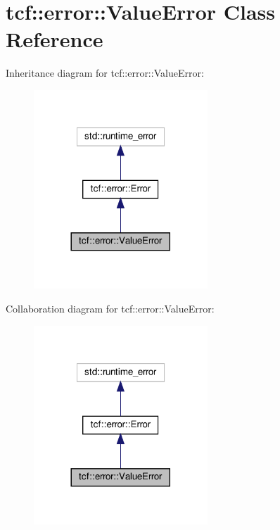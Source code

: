 \hypertarget{classtcf_1_1error_1_1ValueError}{}\section{tcf\+:\+:error\+:\+:Value\+Error Class Reference}
\label{classtcf_1_1error_1_1ValueError}


Inheritance diagram for tcf\+:\+:error\+:\+:Value\+Error\+:
\nopagebreak
\begin{figure}[H]
\begin{center}
\leavevmode
\includegraphics[width=185pt]{classtcf_1_1error_1_1ValueError__inherit__graph}
\end{center}
\end{figure}


Collaboration diagram for tcf\+:\+:error\+:\+:Value\+Error\+:
\nopagebreak
\begin{figure}[H]
\begin{center}
\leavevmode
\includegraphics[width=185pt]{classtcf_1_1error_1_1ValueError__coll__graph}
\end{center}
\end{figure}

